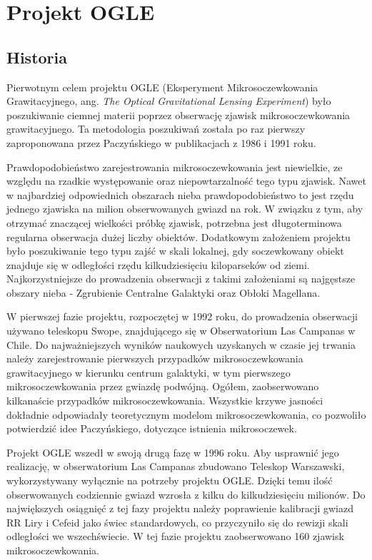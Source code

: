 \documentclass{pracalicmgr}
\begin{document}
	\section{Projekt OGLE}
	\subsection{Historia}
    Pierwotnym celem projektu OGLE (Eksperyment Mikrosoczewkowania Grawitacyjnego, ang. \textit{The Optical Gravitational Lensing Experiment}) było poszukiwanie ciemnej materii poprzez obserwację zjawisk mikrosoczewkowania grawitacyjnego. Ta metodologia poszukiwań została po raz pierwszy zaproponowana przez Paczyńskiego w publikacjach z 1986 i 1991 roku.
    
    Prawdopodobieństwo zarejestrowania mikrosoczewkowania jest niewielkie, ze względu na rzadkie występowanie oraz niepowtarzalność tego typu zjawisk. Nawet w najbardziej odpowiednich obszarach nieba prawdopodobieństwo to jest rzędu jednego zjawiska na milion obserwowanych gwiazd na rok. W związku z tym, aby otrzymać znaczącej wielkości próbkę zjawisk, potrzebna jest długoterminowa regularna obserwacja dużej liczby obiektów. Dodatkowym założeniem projektu było poszukiwanie tego typu zajść w skali lokalnej, gdy soczewkowany obiekt znajduje się w odległości rzędu kilkudziesięciu kiloparseków od ziemi. Najkorzystniejsze do prowadzenia obserwacji z takimi założeniami są najgęstsze obszary nieba - Zgrubienie Centralne Galaktyki oraz Obłoki Magellana.
   
    W pierwszej fazie projektu, rozpoczętej w 1992 roku, do prowadzenia obserwacji używano teleskopu Swope, znajdującego się w Obserwatorium Las Campanas w Chile. Do najważniejszych wyników naukowych uzyskanych w czasie jej trwania należy zarejestrowanie pierwszych przypadków mikrosoczewkowania grawitacyjnego w kierunku centrum galaktyki, w tym pierwszego mikrosoczewkowania przez gwiazdę podwójną. Ogółem, zaobserwowano kilkanaście przypadków mikrosoczewkowania. Wszystkie krzywe jasności dokładnie odpowiadały teoretycznym modelom mikrosoczewkowania, co pozwoliło potwierdzić idee Paczyńskiego, dotyczące istnienia mikrosoczewek.
    
    Projekt OGLE wszedł w swoją drugą fazę w 1996 roku. Aby usprawnić jego realizację, w obserwatorium Las Campanas zbudowano Teleskop Warszawski, wykorzystywany wyłącznie na potrzeby projektu OGLE. Dzięki temu ilość obserwowanych codziennie gwiazd wzrosła z kilku do kilkudziesięciu milionów. Do największych osiągnięć z tej fazy projektu należy poprawienie kalibracji gwiazd RR Liry i Cefeid jako świec standardowych, co przyczyniło się do rewizji skali odległości we wszechświecie. W tej fazie projektu zaobserwowano 160 zjawisk mikrosoczewkowania.
    
\end{document}
